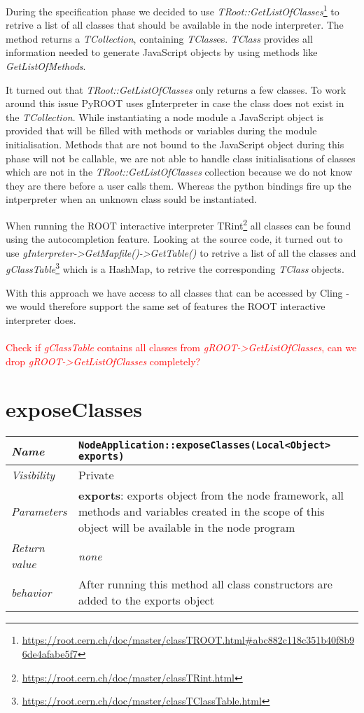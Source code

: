 During the specification phase we decided to use \textit{TRoot::GetListOfClasses}\footnote{\url{https://root.cern.ch/doc/master/classTROOT.html\#abc882c118c351b40f8b96de4afabe5f7}} to retrive a list of all classes that should be available in the node interpreter.
The method returns a \textit{TCollection}, containing \textit{TClass}es.
\textit{TClass} provides all information needed to generate JavaScript objects by using methods like \textit{GetListOfMethods}.

It turned out that \textit{TRoot::GetListOfClasses} only returns a few classes.
To work around this issue PyROOT uses gInterpreter in case the class does not exist in the \textit{TCollection}.
While instantiating a node module a JavaScript object is provided that will be filled with methods or variables during the module initialisation.
Methods that are not bound to the JavaScript object during this phase will not be callable, we are not able to handle class initialisations of classes which are not in the \textit{TRoot::GetListOfClasses} collection because we do not know they are there before a user calls them.
Whereas the python bindings fire up the intperpreter when an unknown class sould be instantiated.

When running the ROOT interactive interpreter TRint\footnote{\url{https://root.cern.ch/doc/master/classTRint.html}} all classes can be found using the autocompletion feature.
Looking at the source code, it turned out to use \textit{gInterpreter-\textgreater GetMapfile()-\textgreater GetTable()} to retrive a list of all the classes and \textit{gClassTable}\footnote{\url{https://root.cern.ch/doc/master/classTClassTable.html}} which is a HashMap, to retrive the corresponding \textit{TClass} objects.

With this approach we have access to all classes that can be accessed by Cling - we would therefore support the same set of features the ROOT interactive interpreter does.
\\
\\
\textcolor{red}{Check if \textit{gClassTable} contains all classes from \textit{gROOT-\textgreater GetListOfClasses}, can we drop \textit{gROOT-\textgreater GetListOfClasses} completely?}
\newpage
\section{exposeClasses}
\begin{longtable}{p{3cm} @{\hskip 1cm} p{12cm}}
  \hline
  \textit{Name} & \texttt{NodeApplication::exposeClasses(Local<Object> exports)} \\
  \hline
  \textit{Visibility} & Private \\
  \hline
  \textit{Parameters} & \textbf{exports}: exports object from the node framework, all methods and variables created in the scope of this object will be available in the node program \\
  \hline
  \textit{Return value} & \textit{none} \\
  \hline
  \textit{behavior} & After running this method all class constructors are added to the exports object \\
  \hline
\end{longtable}


